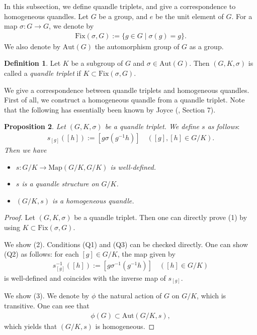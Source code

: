 \documentclass[12pt]{amsart}
\newtheorem{Prop}{Proposition}[section]
\theoremstyle{definition}
\newtheorem{Def}[Prop]{Definition}
\begin{document}
In this subsection, we define quandle triplets, and give a correspondence to homogeneous quandles. Let $ G $ be a group, and $ e $ be the unit element of $ G $. For a map $ \sigma : G \rightarrow G $, we denote by
\begin{align*}
{\mathrm{Fix}}(\sigma,G) := \{ g \in G \mid \sigma(g) = g \}.
\end{align*}
We also denote by $ {\mathrm{Aut}}(G) $ the automorphism group of $ G $ as a group.

\begin{Def}\label{Def3.1}
Let $ K $ be a subgroup of $ G $ and $ \sigma \in {\mathrm{Aut}}(G) $. Then $ (G,K,\sigma) $ is called a \textit{quandle triplet} if $ K \subset {\mathrm{Fix}}(\sigma,G) $.
\end{Def}

We give a correspondence between quandle triplets and homogeneous quandles. First of all, we construct a homogeneous quandle from a quandle triplet. Note that the following has essentially been known by Joyce (\cite{Joyce}, Section 7).

\begin{Prop}\label{Prop3.2}
Let $ (G,K,\sigma) $ be a quandle triplet. We define $ s $ as follows$:$
\begin{align*}
s_{[g]}([h]) := [g\sigma(g^{-1}h)] \quad ([g],[h] \in G/K).
\end{align*}
Then we have
\begin{itemize}
\item[(1)]
$ s : G/K \rightarrow {\mathrm{Map}}(G/K,G/K) $ is well-defined.
\item[(2)]
$ s $ is a quandle structure on $ G/K $.
\item[(3)]
$ (G/K,s) $ is a homogeneous quandle.
\end{itemize}
\end{Prop}

\begin{proof}
Let $ (G,K,\sigma) $ be a quandle triplet. Then one can directly prove (1) by using $ K \subset {\mathrm{Fix}}(\sigma,G) $.

We show (2). Conditions (Q1) and (Q3) can be checked directly. One can show (Q2) as follows: for each $ [g] \in G/K $, the map given by
\begin{align*}
s^{-1}_{[g]}([h]) := [g \sigma^{-1}(g^{-1}h)] \quad ([h] \in G/K)
\end{align*}
is well-defined and coincides with the inverse map of $ s_{[g]} $.

We show (3). We denote by $ \phi $ the natural action of $ G $ on $ G/K $, which is transitive. One can see that
\begin{align*}
\phi(G) \subset {\mathrm{Aut}}(G/K,s),
\end{align*}
which yields that $ (G/K,s) $ is homogeneous.
\end{proof}
\end{document}
